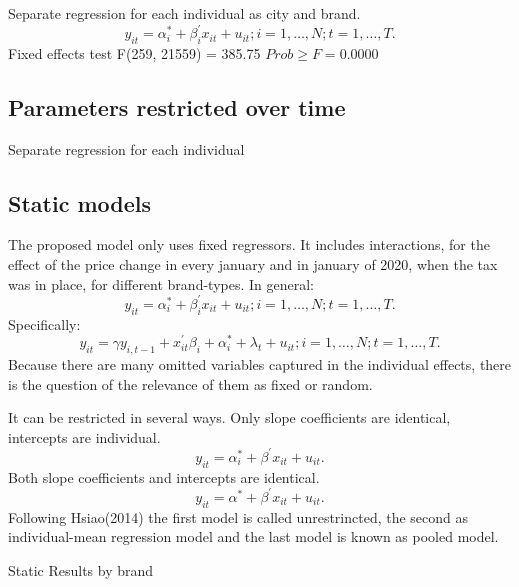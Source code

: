\documentclass[]{article}
\begin{document}
Separate regression for each individual as city and brand.
\begin{equation*}
	y_{it} = \alpha_{i}^{*} + \beta_{i}^{'}x_{it} + u_{it}; i = 1,\ldots,N; t=1,\ldots,T.
\end{equation*}
Fixed effects test
 F(259, 21559) =  385.75
 $Prob \geq F =    0.0000$


\subsection{Parameters restricted over time}
Separate regression for each individual

\subsection{Static models}
The proposed model only uses fixed regressors. 
It includes interactions, for the effect of the price change in every january and in january of 2020, when the tax was in place, for different brand-types.
In general:
\begin{equation*}
	y_{it} = \alpha_{i}^{*} + \beta_{i}^{'}x_{it} + u_{it}; i = 1,\ldots,N; t=1,\ldots,T.
\end{equation*}
Specifically:
\begin{equation*}
	y_{it} = \gamma y_{i,t-1} + x_{it}^{'} \beta_{i} + \alpha_{i}^{*} + \lambda_{t} + u_{it}; i = 1,\ldots,N; t=1,\ldots,T.
\end{equation*}
Because there are many omitted variables captured in the individual effects, there is the question of the relevance of them as fixed or random.

It can be restricted in several ways. 
Only slope coefficients are identical, intercepts are individual.
\begin{equation*}
y_{it} = \alpha_{i}^{*} + \beta^{'}x_{it} + u_{it}.
\end{equation*}
Both slope coefficients and intercepts are identical.
\begin{equation*}
y_{it} = \alpha^{*} + \beta^{'}x_{it} + u_{it}.
\end{equation*}
Following Hsiao(2014) the first model is called unrestrincted, the second as individual-mean regression model and the last model is known as pooled model. 

Static Results by brand 

\begin{landscape}

\end{landscape}
\end{document}
